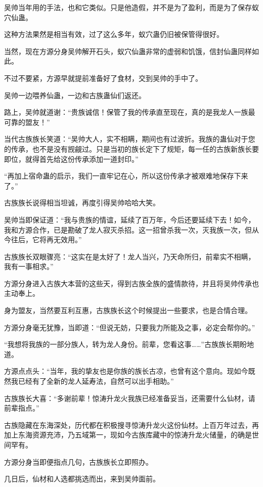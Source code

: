 \begin{this_body}
吴帅当年用的手法，也和它类似。只是他造假，并不是为了盈利，而是为了保存蚁穴仙蛊。

这种方法果然是相当有效，过了这么多年，蚁穴蛊仍旧被保管得很好。

当然，现在方源分身吴帅解开石头，蚁穴仙蛊非常的虚弱和饥饿，信封仙蛊同样如此。

不过不要紧，方源早就提前准备好了食材，交到吴帅的手中了。

吴帅一边喂养仙蛊，一边和古族蛊仙们返还。

路上，吴帅就道谢：“贵族诚信！保管了我的传承直至现在，真的是我龙人一族最可靠的盟友！”

当代古族族长笑道：“吴帅大人，实不相瞒，期间也有过波折。我族的蛊仙对于您的传承，也不是没有觊觎过。只是当初的族长定下了规矩，每一任的古族新族长要即位，就得首先给这份传承添加一道封印。”

“再加上宿命蛊的启示，我们一直牢记在心，所以这份传承才被艰难地保存下来了。”

古族族长说得相当坦诚，再度引得吴帅哈哈大笑。

吴帅当即保证道：“我与贵族的情谊，延续了百万年，今后还要延续下去！如今，我和方源合作，已是勘破了龙人寂灭杀招。这一招曾杀我一次，灭我族一次，但从今往后，它将再无效用。”

古族族长双眼骤亮：“这实在是太好了！龙人当兴，乃天命所归，前辈实不相瞒，我有一事相求。”

方源分身进入古族大本营的这些天，得到古族全族的盛情款待，并且将吴帅传承也主动奉上。

身为盟友，当然要互利互惠，古族族长这个时候提出一些要求，也是合情合理。

方源分身毫无犹豫，当即道：“但说无妨，只要我力所能及之事，必定会帮你的。”

“我想将我族的一部分族人，转为龙人身份。前辈，您看这事……”古族族长期盼地道。

方源点点头：“当年，我的挚友也是你族的族长古凉，也曾有这个意向。现如今既然我已经有了全新的龙人延寿法，自然可以出手相助。”

古族族长大喜：“多谢前辈！惊涛升龙火我族已经准备妥当，还需要什么仙材，请前辈指点。”

古族隐藏在东海深处，历代都在积极搜寻惊涛升龙火这份仙材。上百万年过去，再加上东海资源充沛，乃五域第一，现如今古族库藏中的惊涛升龙火储量，的确是世间罕有。

方源分身当即便指点几句，古族族长立即照办。

几日后，仙材和人选都挑选而出，来到吴帅面前。


\end{this_body}

